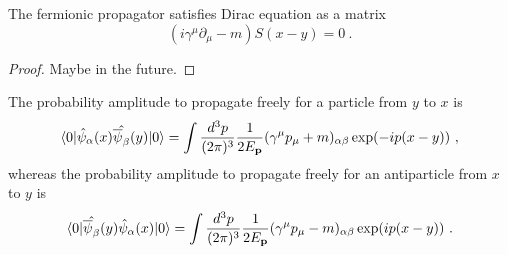     The fermionic propagator satisfies Dirac equation as a matrix 
    \begin{equation*}
        (i \gamma^\mu \partial_\mu - m) S(x-y) = 0~.
    \end{equation*}
    \begin{proof}
        Maybe in the future.
    \end{proof}

    The probability amplitude to propagate freely for a particle from $y$ to $x$ is 
    \begin{equation*}
        \langle0\vert \hat \psi_\alpha (x) \hat {\overline \psi_\beta} (y) \vert0\rangle = \int \frac{d^3 p}{(2\pi)^3} \frac{1}{2E_{\mathbf p}} (\gamma^\mu p_\mu + m)_{\alpha\beta} \exp(- i p (x-y)) ~,
    \end{equation*}
    whereas the probability amplitude to propagate freely for an antiparticle from $x$ to $y$ is 
    \begin{equation*}
        \langle0\vert \hat {\overline \psi_\beta} (y) \hat \psi_\alpha (x) \vert0\rangle = \int \frac{d^3 p}{(2\pi)^3} \frac{1}{2E_{\mathbf p}} (\gamma^\mu p_\mu - m)_{\alpha\beta} \exp(i p (x-y)) ~.
    \end{equation*}